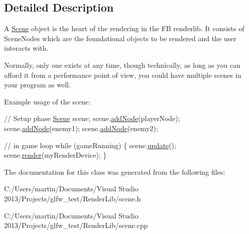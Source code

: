 \subsection{Detailed Description}
A \hyperlink{class_scene}{Scene} object is the heart of the rendering in the FB renderlib. It consists of Scene\+Nodes which are the foundational objects to be rendered and the user interacts with. 

Normally, only one exists at any time, though technically, as long as you can afford it from a performance point of view, you could have multiple scenes in your program as well.

Example usage of the scene\+: 
\begin{DoxyCode}
\textcolor{comment}{// Setup phase}
\hyperlink{class_scene}{Scene} scene;
scene.\hyperlink{class_scene_adcf11ea10fab6c9371fd5bfbf3d08107}{addNode}(playerNode);
scene.\hyperlink{class_scene_adcf11ea10fab6c9371fd5bfbf3d08107}{addNode}(enemy1);
scene.\hyperlink{class_scene_adcf11ea10fab6c9371fd5bfbf3d08107}{addNode}(enemy2);

\textcolor{comment}{// in game loop}
\textcolor{keywordflow}{while} (gameRunning) \{
    scene.\hyperlink{class_scene_a7faff47f5c1b1ebc986f768c9b9732ec}{update}();
    scene.\hyperlink{class_scene_a3eba6b8bf7e5be1ae0809f6f3ded3585}{render}(myRenderDevice);
\}
\end{DoxyCode}
 

The documentation for this class was generated from the following files\+:\begin{DoxyCompactItemize}
\item 
C\+:/\+Users/martin/\+Documents/\+Visual Studio 2013/\+Projects/glfw\+\_\+test/\+Render\+Lib/scene.\+h\item 
C\+:/\+Users/martin/\+Documents/\+Visual Studio 2013/\+Projects/glfw\+\_\+test/\+Render\+Lib/scene.\+cpp\end{DoxyCompactItemize}
